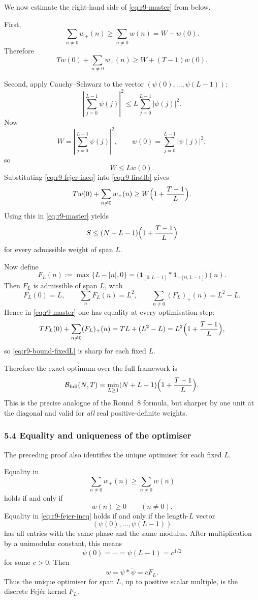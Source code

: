 We now estimate the right-hand side of \eqref{eq:r9-master} from below.

First,
\[
\sum_{n\ne 0} w_+(n)
\ge \sum_{n\ne 0} w(n)
= W-w(0).
\]
Therefore
\begin{equation}
\label{eq:r9-firstlb}
T w(0)+\sum_{n\ne 0} w_+(n)
\ge W+(T-1)w(0).
\end{equation}

Second, apply Cauchy--Schwarz to the vector \((\psi(0),\dots,\psi(L-1))\):
\[
\left|\sum_{j=0}^{L-1}\psi(j)\right|^2
\le L \sum_{j=0}^{L-1}|\psi(j)|^2.
\]
Now
\[
W=\left|\sum_{j=0}^{L-1}\psi(j)\right|^2,
\qquad
w(0)=\sum_{j=0}^{L-1}|\psi(j)|^2,
\]
so
\begin{equation}
\label{eq:r9-fejer-ineq}
W\le L w(0).
\end{equation}
Substituting \eqref{eq:r9-fejer-ineq} into \eqref{eq:r9-firstlb} gives
\[
T w(0)+\sum_{n\ne 0} w_+(n)
\ge W\Bigl(1+\frac{T-1}{L}\Bigr).
\]
Using this in \eqref{eq:r9-master} yields
\begin{equation}
\label{eq:r9-bound-fixedL}
S
\le (N+L-1)\Bigl(1+\frac{T-1}{L}\Bigr)
\end{equation}
for every admissible weight of span \(L\).

Now define
\[
F_L(n):=\max\{L-|n|,0\}
=\bigl(\mathbf 1_{[0,L-1]}*\mathbf 1_{-[0,L-1]}\bigr)(n).
\]
Then \(F_L\) is admissible of span \(L\), with
\[
F_L(0)=L,
\qquad
\sum_n F_L(n)=L^2,
\qquad
\sum_{n\ne 0}(F_L)_+(n)=L^2-L.
\]
Hence in \eqref{eq:r9-master} one has equality at every optimisation step:
\[
T F_L(0)+\sum_{n\ne 0}(F_L)_+(n)=TL+(L^2-L)=L^2\Bigl(1+\frac{T-1}{L}\Bigr),
\]
so \eqref{eq:r9-bound-fixedL} is sharp for each fixed \(L\).

Therefore the exact optimum over the full framework is
\begin{equation}
\label{eq:r9-full-optimum}
\mathcal B_{\mathrm{full}}(N,T)
=
\min_{L\ge 1}(N+L-1)\Bigl(1+\frac{T-1}{L}\Bigr).
\end{equation}
This is the precise analogue of the Round~8 formula, but sharper by one unit at the diagonal and valid for \emph{all} real positive-definite weights.

\subsubsection{5.4 Equality and uniqueness of the optimiser}

The preceding proof also identifies the unique optimiser for each fixed \(L\).

Equality in
\[
\sum_{n\ne 0} w_+(n)\ge \sum_{n\ne 0} w(n)
\]
holds if and only if
\[
w(n)\ge 0\qquad (n\ne 0).
\]
Equality in \eqref{eq:r9-fejer-ineq} holds if and only if the length-\(L\) vector
\[
(\psi(0),\dots,\psi(L-1))
\]
has all entries with the same phase and the same modulus.  After multiplication by a unimodular constant, this means
\[
\psi(0)=\cdots=\psi(L-1)=c^{1/2}
\]
for some \(c>0\).  Then
\[
w=\psi*\widetilde\psi = c F_L.
\]
Thus the unique optimiser for span \(L\), up to positive scalar multiple, is the discrete Fej\'er kernel \(F_L\).

